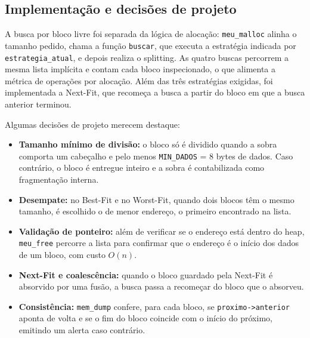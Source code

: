 


\subsection{Implementação e decisões de projeto}

A busca por bloco livre foi separada da lógica de alocação: \texttt{meu\_malloc}
alinha o tamanho pedido, chama a função \texttt{buscar}, que executa a
estratégia indicada por \texttt{estrategia\_atual}, e depois realiza o
splitting. As quatro buscas percorrem a mesma lista implícita e contam cada
bloco inspecionado, o que alimenta a métrica de operações por alocação. Além
das três estratégias exigidas, foi implementada a Next-Fit, que recomeça a
busca a partir do bloco em que a busca anterior terminou.

Algumas decisões de projeto merecem destaque:

\begin{itemize}
    \item \textbf{Tamanho mínimo de divisão:} o bloco só é dividido quando a sobra comporta um cabeçalho e pelo menos \texttt{MIN\_DADOS} = 8 bytes de dados. Caso contrário, o bloco é entregue inteiro e a sobra é contabilizada como fragmentação interna.
    \item \textbf{Desempate:} no Best-Fit e no Worst-Fit, quando dois blocos têm o mesmo tamanho, é escolhido o de menor endereço, o primeiro encontrado na lista.
    \item \textbf{Validação de ponteiro:} além de verificar se o endereço está dentro do heap, \texttt{meu\_free} percorre a lista para confirmar que o endereço é o início dos dados de um bloco, com custo $O(n)$.
    \item \textbf{Next-Fit e coalescência:} quando o bloco guardado pela Next-Fit é absorvido por uma fusão, a busca passa a recomeçar do bloco que o absorveu.
    \item \textbf{Consistência:} \texttt{mem\_dump} confere, para cada bloco, se \texttt{proximo->anterior} aponta de volta e se o fim do bloco coincide com o início do próximo, emitindo um alerta caso contrário.
\end{itemize}

